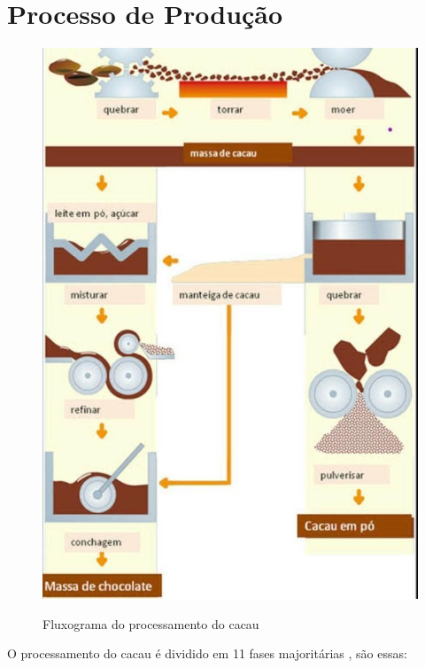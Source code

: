 \documentclass[
	12pt,				%
	openright,			%
	oneside,			%
	a4paper,			%
	english,			%
	french,				%
	spanish,			%
	brazil				%
	]{abntex2}
\begin{document}
\newpage
\chapter{Processo de Produção}


\begin{figure}[H]
\begin{center}
\caption{Fluxograma do processamento do cacau}
\includegraphics[scale=0.28]{../../Pictures/processocacau.jpg} 
\label{fig1}
\end{center}
\end{figure}

O processamento do cacau é dividido em 11 fases majoritárias \cite{3}, são essas:
\end{document}
